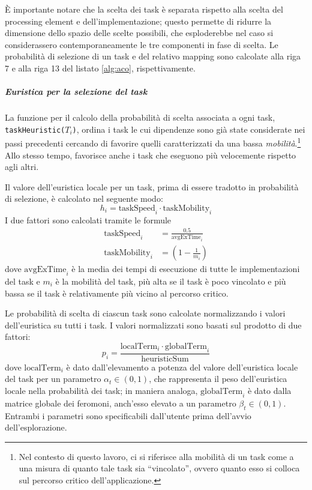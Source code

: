 \`E importante notare che la scelta dei task \`e separata rispetto alla scelta del processing element e
dell'implementazione; questo permette di ridurre la dimensione dello spazio delle scelte possibili,
che esploderebbe nel caso si considerassero contemporaneamente le tre componenti in fase di scelta.
Le probabilit\`a di selezione di un task e del relativo mapping sono calcolate alla riga 7 e alla riga
13 del listato \ref{alg:aco}, rispettivamente.

\subparagraph{Euristica per la selezione del task}
La funzione per il calcolo della probabilit\`a di scelta associata a ogni task,
\verb+taskHeuristic(+$T_i$\verb+)+, ordina i task le cui dipendenze sono gi\`a state
considerate nei passi precedenti cercando di favorire quelli caratterizzati da una bassa
\emph{mobilit\`a}.\footnote{Nel contesto di questo lavoro, ci si riferisce alla mobilit\`a di un
  task come a una misura di quanto tale task sia ``vincolato'', ovvero quanto esso
si colloca sul percorso critico dell'applicazione.}
Allo stesso tempo, favorisce anche i task che eseguono pi\`u velocemente rispetto agli altri.

Il valore dell'euristica locale per un task, prima di essere tradotto in probabilit\`a di
selezione, \`e calcolato nel seguente modo:
\begin{equation}
  h_i = \text{taskSpeed}_i \cdot \text{taskMobility}_i
\end{equation}
I due fattori sono calcolati tramite le formule
\begin{align*}
  \text{taskSpeed}_i &= \frac{0.5}{\text{avgExTime}_i}\\
  \text{taskMobility}_i &= (1 - \frac{1}{m_i})
\end{align*}
dove $\text{avgExTime}_i$ \`e la media dei tempi di esecuzione di tutte le implementazioni del task
e $m_i$ \`e la mobilit\`a del task, pi\`u alta se il task \`e poco vincolato e pi\`u bassa se il task
\`e relativamente pi\`u vicino al percorso critico.

Le probabilit\`a di scelta di ciascun task sono calcolate normalizzando i valori dell'euristica
su tutti i task. I valori normalizzati sono basati sul prodotto di due fattori:
\begin{equation}
  p_i = \frac{\text{localTerm}_i \cdot \text{globalTerm}_i}{\text{heuristicSum}}
\end{equation}
dove $\text{localTerm}_i$ \`e dato dall'elevamento a potenza del valore dell'euristica locale del
task per un parametro $\alpha_t \in (0,1)$, che rappresenta il peso dell'euristica locale
nella probabilit\`a dei task; in maniera analoga, $\text{globalTerm}_i$ \`e dato dalla matrice globale dei feromoni,
anch'esso elevato a un parametro $\beta_t \in (0,1)$. Entrambi i parametri sono specificabili
dall'utente prima dell'avvio dell'esplorazione.

